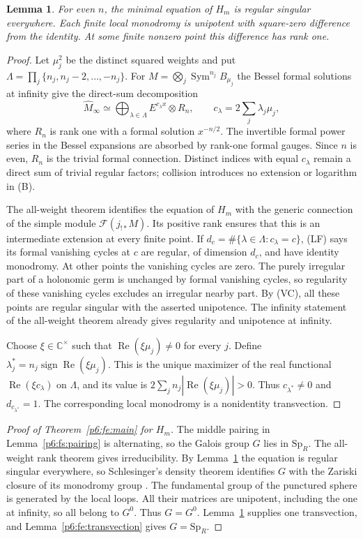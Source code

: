\documentclass[11pt,a4paper]{article}
\newtheorem{lemma}[theorem]{Lemma}
\theoremstyle{definition}
\theoremstyle{remark}
\numberwithin{equation}{section}
\begin{document}
\begin{lemma}\label{p6:fe:local}
For even $n$, the minimal equation of $H_m$ is regular singular
everywhere. Each finite local monodromy is unipotent with square-zero
difference from the identity. At some finite nonzero point this
difference has rank one.
\end{lemma}
\begin{proof}
Let $\mu_j^2$ be the distinct squared weights and put
$\Lambda=\prod_j\{n_j,n_j-2,\ldots,-n_j\}$.
For $M=\bigotimes_j\operatorname{Sym}^{n_j}B_{\mu_j}$ the Bessel
formal solutions at infinity give the direct-sum decomposition
\[
 \widehat M_\infty\simeq
 \bigoplus_{\lambda\in\Lambda}
    E^{c_\lambda x}\otimes R_n,
 \qquad c_\lambda=2\sum_j\lambda_j\mu_j,
 \tag{B}
\]
where $R_n$ is rank one with a formal solution $x^{-n/2}$.
The invertible formal power series in the Bessel expansions are
absorbed by rank-one formal gauges. Since $n$ is even, $R_n$ is
the trivial formal connection. Distinct indices with equal
$c_\lambda$ remain a direct sum of trivial regular factors;
collision introduces no extension or logarithm in (B).

The all-weight theorem identifies the equation of $H_m$ with the
generic connection of the simple module
$\mathcal F(j_{!*}M)$. Its positive rank ensures that this is an
intermediate extension at every finite point. If
$d_c=\#\{\lambda\in\Lambda:c_\lambda=c\}$, (LF) says its formal
vanishing cycles at $c$ are regular, of dimension $d_c$, and have
identity monodromy. At other points the vanishing cycles are zero.
The purely irregular part of a holonomic germ is unchanged by
formal vanishing cycles, so regularity of these vanishing cycles
excludes an irregular nearby part. By (VC), all these points are
regular singular with the asserted unipotence. The infinity statement of the all-weight theorem
already gives regularity and unipotence at infinity.

Choose $\xi\in\mathbb C^\times$ such that
$\operatorname{Re}(\xi\mu_j)\ne0$ for every $j$. Define
$\lambda_j^*=n_j\operatorname{sign}\operatorname{Re}(\xi\mu_j)$.
This is the unique maximizer of the real functional
$\operatorname{Re}(\xi c_\lambda)$ on $\Lambda$, and its value is
$2\sum_jn_j|\operatorname{Re}(\xi\mu_j)|>0$.
Thus $c_{\lambda^*}\ne0$ and $d_{c_{\lambda^*}}=1$.
The corresponding local monodromy is a nonidentity transvection.
\end{proof}

\begin{proof}[Proof of Theorem~\ref{p6:fe:main} for $H_m$]
The middle pairing in Lemma~\ref{p6:fs:pairing} is alternating, so the
Galois group $G$ lies in $\mathrm{Sp}_R$. The all-weight rank theorem
gives irreducibility. By Lemma~\ref{p6:fe:local} the equation is
regular singular everywhere, so Schlesinger's density theorem
identifies $G$ with the Zariski closure of its monodromy group
\cite{p5:BG_vdPS2003}. The fundamental group of the punctured sphere
is generated by the local loops. All their matrices are unipotent,
including the one at infinity, so all belong to $G^0$. Thus $G=G^0$.
Lemma~\ref{p6:fe:local} supplies one transvection, and
Lemma~\ref{p6:fe:transvection} gives $G=\mathrm{Sp}_R$.
\end{proof}
\end{document}
